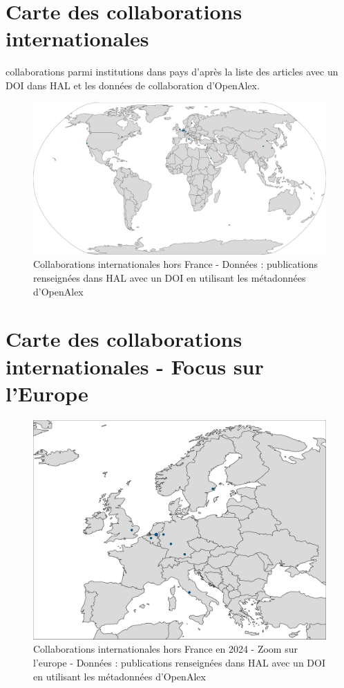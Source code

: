 \documentclass[french, 11pt]{assets/biso}
\begin{document}
\pagebreak

\section{Carte des collaborations internationales}

{\collaborationsnb} collaborations parmi {\institutionsnb} institutions dans {\countriesnb} pays d'après la liste des articles avec un DOI dans HAL et les données de collaboration d'OpenAlex.

\begin{figure}[!h]
  \hspace{-.1\textwidth}\includegraphics[width=1.2\textwidth]{figures/collaborations_map.pdf}
  \caption{Collaborations internationales hors France - Données : publications renseignées dans HAL avec un DOI en utilisant les métadonnées d'OpenAlex}
  \label{fig_collab_map}
\end{figure}

\pagebreak

\section{Carte des collaborations internationales - Focus sur l’Europe}

\begin{figure}[!h]
  \includegraphics[width=\textwidth]{figures/collaborations_map_europe.pdf}
  \caption{Collaborations internationales hors France en 2024 - Zoom sur l'europe - Données : publications renseignées dans HAL avec un DOI en utilisant les métadonnées d'OpenAlex}
  \label{fig_collab_map_europe}
\end{figure}
\end{document}
